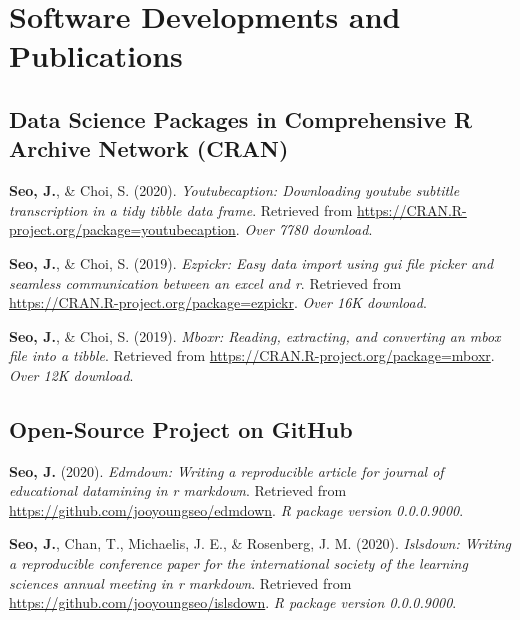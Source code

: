 \documentclass[11pt, a4paper]{awesome-cv}
\begin{document}
\hypertarget{software-developments-and-publications}{%
\section{Software Developments and
Publications}\label{software-developments-and-publications}}

\hypertarget{data-science-packages-in-comprehensive-r-archive-network-cran}{%
\subsection{Data Science Packages in Comprehensive R Archive Network
(CRAN)}\label{data-science-packages-in-comprehensive-r-archive-network-cran}}

\hypertarget{refs_R_packages}{}
\leavevmode\hypertarget{ref-R-youtubecaption}{}%
\textbf{Seo, J.}, \& Choi, S. (2020). \emph{Youtubecaption: Downloading
youtube subtitle transcription in a tidy tibble data frame}. Retrieved
from \url{https://CRAN.R-project.org/package=youtubecaption}. \emph{Over
7780 download}.

\leavevmode\hypertarget{ref-R-ezpickr}{}%
\textbf{Seo, J.}, \& Choi, S. (2019). \emph{Ezpickr: Easy data import
using gui file picker and seamless communication between an excel and
r}. Retrieved from \url{https://CRAN.R-project.org/package=ezpickr}.
\emph{Over 16K download}.

\leavevmode\hypertarget{ref-R-mboxr}{}%
\textbf{Seo, J.}, \& Choi, S. (2019). \emph{Mboxr: Reading, extracting,
and converting an mbox file into a tibble}. Retrieved from
\url{https://CRAN.R-project.org/package=mboxr}. \emph{Over 12K
download}.

\hypertarget{open-source-project-on-github}{%
\subsection{Open-Source Project on
GitHub}\label{open-source-project-on-github}}

\hypertarget{refs_github_projects}{}
\leavevmode\hypertarget{ref-R-edmdown}{}%
\textbf{Seo, J.} (2020). \emph{Edmdown: Writing a reproducible article
for journal of educational datamining in r markdown}. Retrieved from
\url{https://github.com/jooyoungseo/edmdown}. \emph{R package version
0.0.0.9000}.

\leavevmode\hypertarget{ref-R-islsdown}{}%
\textbf{Seo, J.}, Chan, T., Michaelis, J. E., \& Rosenberg, J. M.
(2020). \emph{Islsdown: Writing a reproducible conference paper for the
international society of the learning sciences annual meeting in r
markdown}. Retrieved from \url{https://github.com/jooyoungseo/islsdown}.
\emph{R package version 0.0.0.9000}.
\end{document}
